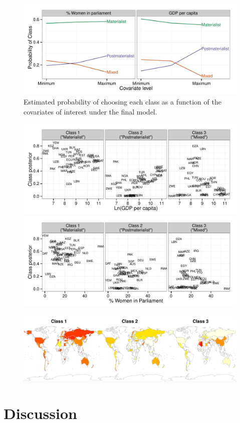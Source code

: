 \documentclass[letterpaper,12pt]{article}
\begin{document}
\begin{figure}
	\includegraphics[width=\textwidth]{figures/covariates.pdf}
	\caption{\label{fig:covariates}Estimated probability of choosing each class as a function of the covariates of interest under the final model.}
\end{figure}

\begin{figure}
	\includegraphics[width=\textwidth]{figures/gdp-posterior.pdf}
	
	\includegraphics[width=\textwidth]{figures/women-posterior.pdf}

	\caption{\label{fig:posterior}}
\end{figure}

\begin{figure}
	\includegraphics[width=\textwidth]{figures/maps.pdf}
	
	\caption{\label{fig:maps}}
\end{figure}

\section{Discussion}





\end{document}
